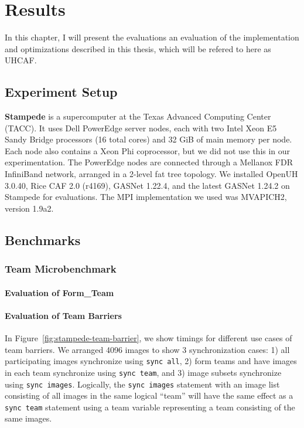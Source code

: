 \chapter{Results}\label{chap:Results}
In this chapter, I will present the evaluations an evaluation of the implementation and optimizations described in this thesis, which will be refered to here as UHCAF.

\section{Experiment Setup}
\textbf{Stampede} is a supercomputer at the Texas Advanced Computing Center
(TACC). It uses Dell PowerEdge server nodes, each with two Intel Xeon E5 Sandy
Bridge processors (16 total cores) and 32 GiB of main memory per node. Each
node also contains a Xeon Phi coprocessor, but we did not use this in our
experimentation. The PowerEdge nodes are connected through a Mellanox FDR
InfiniBand network, arranged in a 2-level fat tree topology. 
We installed OpenUH 3.0.40, Rice CAF 2.0 (r4169), GASNet 1.22.4, and the
latest GASNet 1.24.2 on Stampede for evaluations. The MPI implementation we used was MVAPICH2, version 1.9a2.

\section{Benchmarks}
\subsection{Team Microbenchmark}
\subsubsection{Evaluation of Form\_Team}

\subsubsection{Evaluation of Team Barriers}
In Figure~\ref{fig:stampede-team-barrier}, we show timings for different use
cases of team barriers. We arranged 4096 images to show 3 synchronization cases: 1)
all participating images synchronize using \texttt{sync all}, 2) form
teams and have images in each team synchronize using \texttt{sync team}, and
3) image subsets synchronize using \texttt{sync images}.  Logically, the
\texttt{sync images} statement with an image list consisting of all images in
the same logical ``team'' will have the same effect as
a \texttt{sync team} statement using a team variable representing a team
consisting of the same images.

